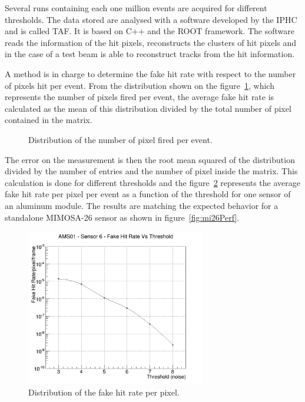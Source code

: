   Several runs containing each one million events are acquired for different thresholds. 
  The data stored are analysed with a software developed by the IPHC and is called \gls{TAF}\cite{TAF2015}.
  It is based on C++ and the ROOT framework.
  The software reads the information of the hit pixels, reconstructs the clusters of hit pixels and in the case of a test beam is able to reconstruct tracks from the hit information.

  A method is in charge to determine the fake hit rate with respect to the number of pixels hit per event.
  From the distribution shown on the figure~\ref{fig:pixel/event}, which represents the number of pixels fired per event, the average fake hit rate is calculated as the mean of this distribution divided by the total number of pixel contained in the matrix.
    \begin{figure}
    \caption{Distribution of the number of pixel fired per event.}
    \label{fig:pixel/event}
  \end{figure}
  The error on the measurement is then the root mean squared of the distribution divided by the number of entries and the number of pixel inside the matrix.
  This calculation is done for different thresholds and the figure~\ref{fig:FHR} represents the average fake hit rate per pixel per event as a function of the threshold for one sensor of an aluminum module.
  The results are matching the expected behavior for a standalone MIMOSA-26 sensor as shown in figure~\ref{fig:mi26Perf}.

  \begin{figure}
    \centering
    \includegraphics[width=0.7\textwidth]{Pictures/labTests/fake_sensor6.png}
    \caption{Distribution of the fake hit rate per pixel.}
    \label{fig:FHR}
  \end{figure}

